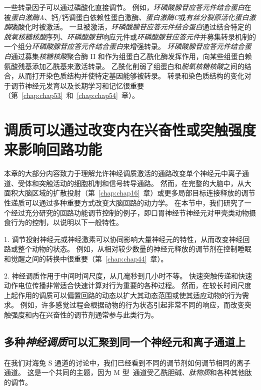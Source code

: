 一些转录因子可以通过磷酸化直接调节。
例如，\textit{环磷酸腺苷应答元件结合蛋白}在被\textit{蛋白激酶A}、钙/钙调蛋白依赖性蛋白激酶、\textit{蛋白激酶C}或\textit{有丝分裂原活化蛋白激酶}磷酸化时被激活。
一旦被激活，\textit{环磷酸腺苷应答元件结合蛋白}通过结合特定的\textit{脱氧核糖核酸}序列、\textit{环磷酸腺苷}响应元件或\textit{环磷酸腺苷应答元件}并募集转录机制的一个组分\textit{环磷酸腺苷应答元件结合蛋白}来增强转录。
\textit{环磷酸腺苷应答元件结合蛋白}通过募集\textit{核糖核酸}聚合酶 II 和作为组蛋白乙酰化酶发挥作用，向某些组蛋白赖氨酸残基添加乙酰基来激活转录。
乙酰化削弱了组蛋白和\textit{脱氧核糖核酸}之间的结合，从而打开染色质结构并使特定基因能够被转录。
转录和染色质结构的变化对于调节神经元发育以及长期学习和记忆很重要（第~\ref{chap:chap53}~和~\ref{chap:chap54}~章）。



\section{调质可以通过改变内在兴奋性或突触强度来影响回路功能}

本章的大部分内容致力于理解允许神经调质激活的通路改变单个神经元中离子通道、受体和突触活动的细胞机制和信号转导通路。
然而，在完整的大脑中，从大面积大脑区域的扩散投射（第~\ref{chap:chap16}~章）或更多局部目标连接释放的调节性递质可以通过多种重要方式改变大脑回路的动力学。
在本节中，我们研究了一个经过充分研究的回路功能调节控制的例子，即口胃神经节神经元对甲壳类动物摄食行为的控制，以说明以下一般特性。


1. 调节投射神经元或神经激素可以协同影响大量神经元的特性，从而改变神经回路或整个动物的状态。
例如，从相对较少数量的神经元释放的调节剂在控制睡眠和觉醒之间的转换中很重要（第~\ref{chap:chap44}~章）。


2. 神经调质作用于中间时间尺度，从几毫秒到几小时不等。
快速突触传递和快速动作电位传播非常适合快速计算对行为重要的各种过程。
然而，在较长时间尺度上起作用的调质可以偏置回路的动态以扩大其动态范围或使其适应动物的行为需求。
例如，许多感觉过程会根据动物的行为状态引起非常不同的响应，而改变突触强度和内在兴奋性的调节剂通常参与此类行为。



\subsection{多种\textit{神经调质}可以汇聚到同一个神经元和离子通道上}

在我们对海兔 S 通道的讨论中，我们已经看到不同的调节剂如何调节相同的离子通道。
这是一个共同的主题，因为 M 型~通道受乙酰胆碱、\textit{肽物质}和各种其他肽的调节。


